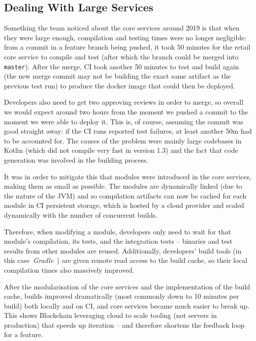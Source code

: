\documentclass[conference]{IEEEtran}
\begin{document}
    \subsection{Dealing With Large Services}

    Something the team noticed about the core services around 2019 is that when they were large
    enough, compilation and testing times were no longer negligible: from a commit in a feature
    branch being pushed, it took 50 minutes for the retail core service to compile and test
    (after which the branch could be merged into \texttt{master}).
    After the merge, CI took another 50 minutes to test and build again (the new merge commit
    may not be building the exact same artifact as the previous test run) to produce
    the docker image that could then be deployed.

    Developers also need to get two approving reviews in order to merge, so overall we would
    expect around two hours from the moment we pushed a commit to the moment we were able to deploy it.
    This is, of course, assuming the commit was good straight away: if the CI runs reported
    test failures, at least another 50m had to be accounted for.
    The causes of the problem were mainly large codebases in Kotlin (which did not compile very fast in version 1.3)
    and the fact that code generation was involved in the building process.

    It was in order to mitigate this that modules were introduced in the core services, making them
    as small as possible.
    The modules are dynamically linked (due to the nature of the JVM) and so compilation artifacts
    can now be cached for each module in CI persistent storage, which is hosted by a cloud provider
    and scaled dynamically with the number of concurrent builds.

    Therefore, when modifying a module, developers only need to wait for that module's compilation,
    its tests, and the integration tests -- binaries and test results from other modules are reused.
    Additionally, developers' build tools (in this case~\emph{Gradle}~\cite{gradle.org}) are given remote read
    access to the build cache, so their local compilation times also massively improved.

    After the modularisation of the core services and the implementation of the build cache, builds
    improved dramatically (most commonly down to 10 minutes per build) both locally and on CI, and
    core services became much easier to break up.
    This shows Blockchain leveraging cloud to scale tooling (not servers in production) that speeds
    up iteration -- and therefore shortens the feedback loop for a feature.
\end{document}
